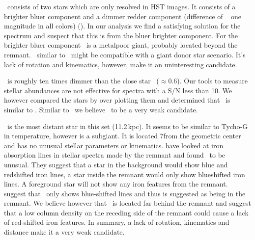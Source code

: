  \starc\ consists of two stars which are only resolved in HST images. It consists of a brighter bluer component and a dimmer redder component (difference of ~ one magnitude in all colors) (\rl). In our analysis we find a satisfying solution for the spectrum and suspect that this is from the bluer brighter component. 
For the brighter bluer component \starc\ is a metalpoor giant, probably located beyond the remnant. \starc\ similar to \stara\ might be compatible with a giant donor star scenario. It's lack of rotation and kinematics, however, make it an uninteresting candidate.

\stard\ is roughly ten times dimmer than the close star \starc\ ($\approx 0.6$\arcsec). Our tools to measure stellar abundances are not effective for spectra with a S/N less than 10. We however compared the stars by over plotting them and determined that \stard\ is similar to \starc. Similar to \starc\ we believe \stard\ to be a very weak candidate.

\stare\ is the most distant star in this set (11.2\,kpc). It seems to be similar to  Tycho-G in temperature, however is a subgiant. It is located 7\arcsec from the geometric center and has no unusual stellar parameters or kinematics. \citet{2007PASJ...59..811I} have looked at iron absorption lines in stellar spectra made by the remnant and found \stare\ to be unusual. They suggest that a star in the background would show blue and redshifted iron lines, a star inside the remnant would only show blueshifted iron lines.  A foreground star will not show any iron features from the remnant. \citet{2007PASJ...59..811I}  suggest that \stare\ only shows blue-shifted lines and thus is suggested as being in the remnant. We believe however that \stare\ is located far behind the remnant and suggest that a low column density on the receding side of the remnant could cause a lack of red-shifted iron features.  
In summary, a lack of rotation, kinematics and distance make it a very weak candidate.

